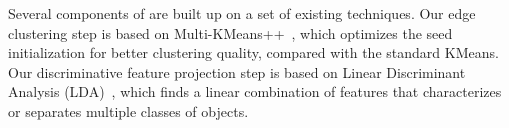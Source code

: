 




Several components of \tool are built up on a set of existing techniques. Our edge clustering step is based on Multi-KMeans++~\cite{Arthur:2007:KAC:1283383.1283494}, which optimizes the seed initialization for better clustering quality, compared with the standard KMeans. 
Our discriminative feature projection step is based on Linear Discriminant Analysis (LDA)~\cite{Mika99fisherdiscriminant}, which finds a linear combination of features that characterizes or separates multiple classes of objects. 

